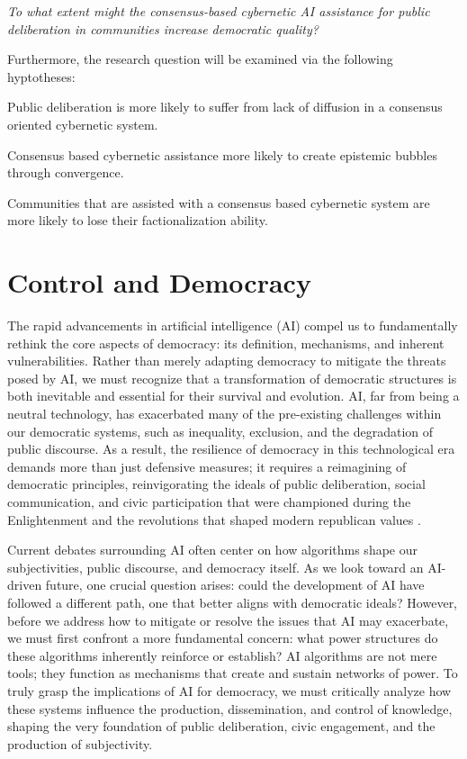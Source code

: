 \textit{ To what extent might the consensus-based cybernetic AI assistance for public deliberation in communities increase democratic quality?}

Furthermore, the research question will be examined via the following
hyptotheses: 

 Public deliberation is more likely to suffer from lack of diffusion in a consensus oriented cybernetic system.

 Consensus based cybernetic assistance more likely to
create epistemic bubbles through convergence.

 Communities that are assisted with a consensus based
cybernetic system are more likely to lose their factionalization ability.


\chapter{Control and Democracy}

The rapid advancements in artificial intelligence (AI) compel us to fundamentally rethink the core aspects of democracy: its definition, mechanisms, and inherent vulnerabilities. Rather than merely adapting democracy to mitigate the threats posed by AI, we must recognize that a transformation of democratic structures is both inevitable and essential for their survival and evolution. AI, far from being a neutral technology, has exacerbated many of the pre-existing challenges within our democratic systems, such as inequality, exclusion, and the degradation of public discourse. As a result, the resilience of democracy in this technological era demands more than just defensive measures; it requires a reimagining of democratic principles, reinvigorating the ideals of public deliberation, social communication, and civic participation that were championed during the Enlightenment and the revolutions that shaped modern republican values \parencite[see]{coeckelbergh2024}.

Current debates surrounding AI often center on how algorithms shape our subjectivities, public discourse, and democracy itself. As we look toward an AI-driven future, one crucial question arises: could the development of AI have followed a different path, one that better aligns with democratic ideals? However, before we address how to mitigate or resolve the issues that AI may exacerbate, we must first confront a more fundamental concern: what power structures do these algorithms inherently reinforce or establish? AI algorithms are not mere tools; they function as mechanisms that create and sustain networks of power. To truly grasp the implications of AI for democracy, we must critically analyze how these systems influence the production, dissemination, and control of knowledge, shaping the very foundation of public deliberation, civic engagement, and the production of subjectivity.

